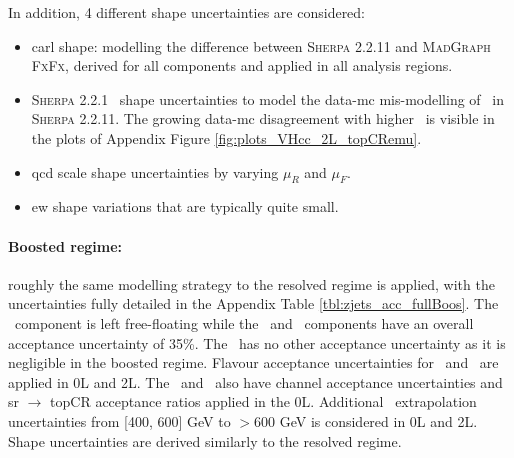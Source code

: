 In addition, 4 different shape uncertainties are considered:
\begin{itemize}
    \item \gls{carl} shape: modelling the difference between \textsc{Sherpa} 2.2.11 and \textsc{MadGraph FxFx}, derived for all components and applied in all analysis regions.
    \item \textsc{Sherpa} 2.2.1 \ptv\ shape uncertainties to model the data-\gls{mc} mis-modelling of \ptv\ in \textsc{Sherpa} 2.2.11. The growing data-\gls{mc} disagreement with higher \ptv\ is visible in the plots of Appendix Figure \ref{fig:plots_VHcc_2L_topCRemu}.
    \item \gls{qcd} scale shape uncertainties by varying $\mu_R$ and $\mu_F$.
    \item \gls{ew} shape variations that are typically quite small.
\end{itemize} 

\paragraph{Boosted regime:} roughly the same modelling strategy to the resolved regime is applied, with the uncertainties fully detailed in the Appendix Table \ref{tbl:zjets_acc_fullBoos}. The \zhf\ component is left free-floating while the \zmf\ and \zlf\ components have an overall acceptance uncertainty of 35\%. The \zlf\ has no other acceptance uncertainty as it is negligible in the boosted regime. Flavour acceptance uncertainties for \zhf\ and \zmf\ are applied in 0L and 2L. The \zhf\ and \zmf\ also have channel acceptance uncertainties and \gls{sr} $\rightarrow$ topCR acceptance ratios applied in the 0L. Additional \ptv\ extrapolation uncertainties from [400, 600] GeV to $> 600$ GeV is considered in 0L and 2L. Shape uncertainties are derived similarly to the resolved regime. 

